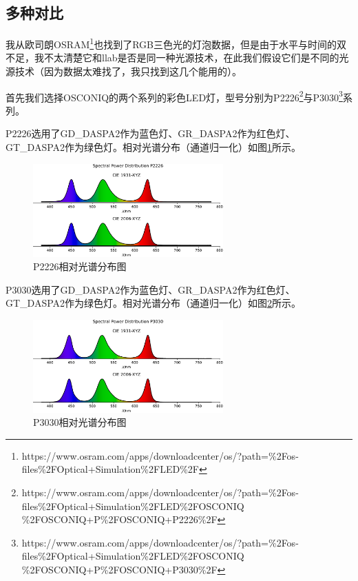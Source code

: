 \subsection{多种对比}

我从欧司朗OSRAM\footnote{https://www.osram.com/apps/downloadcenter/os/?path=\%2Fos-files\%2FOptical+Simulation\%2FLED\%2F}也找到了RGB三色光的灯泡数据，但是由于水平与时间的双不足，我不太清楚它和llab是否是同一种光源技术，在此我们假设它们是不同的光源技术（因为数据太难找了，我只找到这几个能用的）。

首先我们选择OSCONIQ的两个系列的彩色LED灯，型号分别为P2226\footnote{https://www.osram.com/apps/downloadcenter/os/?path=\%2Fos-files\%2FOptical+Simulation\%2FLED\%2FOSCONIQ\\\%2FOSCONIQ+P\%2FOSCONIQ+P2226\%2F}与P3030\footnote{https://www.osram.com/apps/downloadcenter/os/?path=\%2Fos-files\%2FOptical+Simulation\%2FLED\%2FOSCONIQ\\\%2FOSCONIQ+P\%2FOSCONIQ+P3030\%2F}系列。

P2226选用了GD\_DASPA2作为蓝色灯、GR\_DASPA2作为红色灯、GT\_DASPA2作为绿色灯。相对光谱分布（通道归一化）如图\ref{fig:P2226}所示。

\begin{figure}[htbp]
    \centering
    \includegraphics[width=0.65\textwidth]{./imgs/sec4/P2226-spd-n.pdf}
    \caption{P2226相对光谱分布图}
    \label{fig:P2226}
\end{figure}

P3030选用了GD\_DASPA2作为蓝色灯、GR\_DASPA2作为红色灯、GT\_DASPA2作为绿色灯。相对光谱分布（通道归一化）如图\ref{fig:P3030}所示。

\begin{figure}[htbp]
    \centering
    \includegraphics[width=0.65\textwidth]{./imgs/sec4/P3030-spd-n.pdf}
    \caption{P3030相对光谱分布图}
    \label{fig:P3030}
\end{figure}

